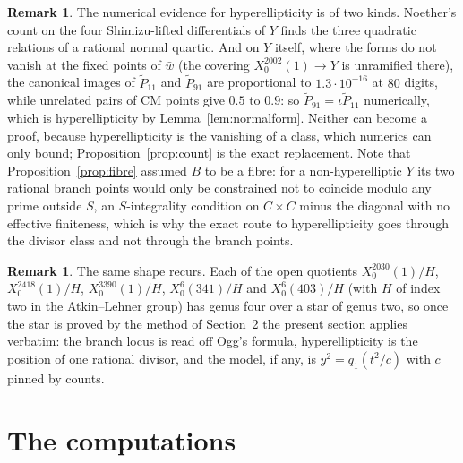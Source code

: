 \documentclass[11pt,reqno]{amsart}
\theoremstyle{plain}
\theoremstyle{definition}
\newtheorem{remark}[theorem]{Remark}
\begin{document}
\begin{remark}\label{rem:gap}
The numerical evidence for hyperellipticity is of two kinds. Noether's count on the four
Shimizu-lifted differentials of $Y$ finds the three quadratic relations of a rational normal
quartic. And on $Y$ itself, where the forms do not vanish at the fixed points of $\bar w$ (the
covering $X_0^{2002}(1)\to Y$ is unramified there), the canonical images of $\tilde P_{11}$ and
$\tilde P_{91}$ are proportional to $1.3\cdot10^{-16}$ at $80$ digits, while unrelated pairs of CM
points give $0.5$ to $0.9$: so $\tilde P_{91}=\iota\tilde P_{11}$ numerically, which is
hyperellipticity by Lemma~\ref{lem:normalform}. Neither can become a proof, because hyperellipticity
is the vanishing of a class, which numerics can only bound; Proposition~\ref{prop:count} is the
exact replacement. Note that Proposition~\ref{prop:fibre} assumed $B$ to be a fibre: for a
non-hyperelliptic $Y$ its two rational branch points would only be constrained not to coincide
modulo any prime outside $S$, an $S$-integrality condition on $C\times C$ minus the diagonal with no
effective finiteness, which is why the exact route to hyperellipticity goes through the divisor
class and not through the branch points.
\end{remark}

\begin{remark}
The same shape recurs. Each of the open quotients $X_0^{2030}(1)/H$, $X_0^{2418}(1)/H$,
$X_0^{3390}(1)/H$, $X_0^{6}(341)/H$ and $X_0^{6}(403)/H$ (with $H$ of index two in the
Atkin--Lehner group) has genus four over a star of genus two, so once the star is proved by the
method of Section~2 the present section applies verbatim: the branch locus is read off Ogg's
formula, hyperellipticity is the position of one rational divisor, and the model, if any, is
$y^2=q_1(t^2/c)$ with $c$ pinned by counts.
\end{remark}

\section{The computations}\label{sec:computations}
\end{document}
